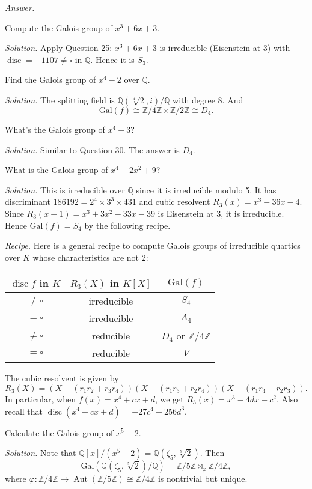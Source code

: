 \documentclass{mathproblems}
\newcommand\Q{\mathbb{Q}}
\newcommand\Z{\mathbb{Z}}
\newcommand\Gal{\mathrm{Gal}}
\begin{document}
\begin{questions}
\textit{Answer.}

\miquestion
{\color{blue} Compute the Galois group of $x^{3}+6 x+3$.}

\textit{Solution.}
Apply Question 25: $x^{3}+6 x+3$ is irreducible (Eisenstein at 3) with $\operatorname{disc}=-1107 \neq \square$ in $\Q$. Hence it is $S_3$.

\miquestion
{\color{blue} Find the Galois group of $x^{4}-2$ over $\Q$.}

\textit{Solution.}
The splitting field is $\Q(\sqrt[4]{2},i)/\Q$ with degree 8. And
$$
\Gal(f)\cong \Z/4\Z \rtimes \Z/2\Z\cong D_4.
$$

\miquestion
{\color{blue} What's the Galois group of $x^{4}-3$?}

\textit{Solution.}
Similar to Question 30. The answer is $D_4$.

\miquestion
{\color{blue} What is the Galois group of $x^{4}-2 x^{2}+9$?}

\textit{Solution.}
This is irreducible over $\Q$ since it is irreducible modulo 5. It has discriminant $186192=2^4\times 3^3\times 431$ and cubic resolvent $R_3(x)=x^3-36x-4$. Since $R_3(x+1)=x^3 + 3 x^2 - 33 x - 39$ is Eisenstein at 3, it is irreducible. Hence $\Gal(f)=S_4$ by the following recipe.

{\color{violet}
\textit{Recipe.} Here is a general recipe to compute Galois groups of irreducible quartics over $K$ whose characteristics are not 2:
\begin{center}
\begin{tabular}{c|c|c}
$\operatorname{disc} f$ in $K$ & $R_{3}(X)$ in $K[X]$ & $\Gal(f)$ \\
\hline$\neq \square$ & irreducible & $S_{4}$ \\
$=\square$ & irreducible & $A_{4}$ \\
$\neq \square$ & reducible & $D_{4}$ or $\Z / 4 \Z$ \\
$=\square$ & reducible & $V$
\end{tabular}
\end{center}
The cubic resolvent is given by
$$
R_{3}(X)=(X-(r_{1} r_{2}+r_{3} r_{4}))(X-(r_{1} r_{3}+r_{2} r_{4}))(X-(r_{1} r_{4}+r_{2} r_{3})).
$$
In particular, when $f(x)=x^{4}+c x+d$, we get $R_{3}(x)=x^{3}-4 d x-c^{2}$. Also recall that $\operatorname{disc}(x^{4}+c x+d)=-27c^4+256d^3$.
}

\miquestion
{\color{blue} Calculate the Galois group of $x^{5}-2$.}

\textit{Solution.}
Note that $\Q[x]/(x^5-2)=\Q(\zeta_5, \sqrt[5]{2})$. Then
$$
\Gal(\Q(\zeta_5, \sqrt[5]{2})/\Q)=\Z/5\Z \rtimes_{\varphi} \Z/4\Z,
$$
where $\varphi:\Z/4\Z \to \operatorname{Aut}(\Z/5\Z)\cong \Z/4\Z$ is nontrivial but unique.



\end{questions}
\end{document}
